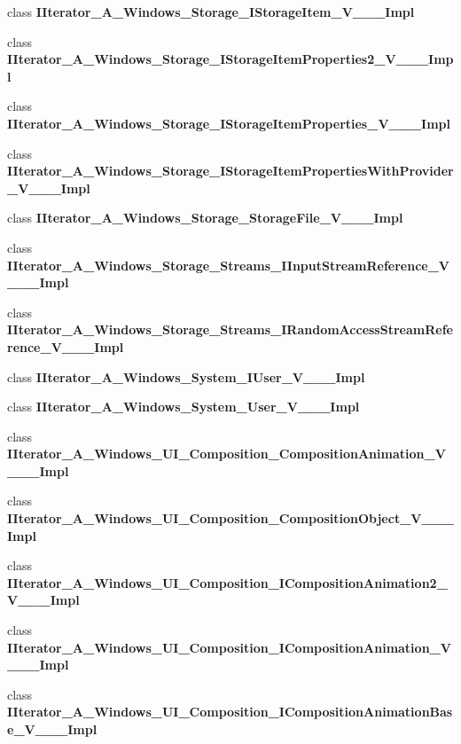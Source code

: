 \begin{DoxyCompactItemize}
\item 
class {\bfseries I\+Iterator\+\_\+\+A\+\_\+\+Windows\+\_\+\+Storage\+\_\+\+I\+Storage\+Item\+\_\+\+V\+\_\+\+\_\+\+\_\+\+Impl}
\item 
class {\bfseries I\+Iterator\+\_\+\+A\+\_\+\+Windows\+\_\+\+Storage\+\_\+\+I\+Storage\+Item\+Properties2\+\_\+\+V\+\_\+\+\_\+\+\_\+\+Impl}
\item 
class {\bfseries I\+Iterator\+\_\+\+A\+\_\+\+Windows\+\_\+\+Storage\+\_\+\+I\+Storage\+Item\+Properties\+\_\+\+V\+\_\+\+\_\+\+\_\+\+Impl}
\item 
class {\bfseries I\+Iterator\+\_\+\+A\+\_\+\+Windows\+\_\+\+Storage\+\_\+\+I\+Storage\+Item\+Properties\+With\+Provider\+\_\+\+V\+\_\+\+\_\+\+\_\+\+Impl}
\item 
class {\bfseries I\+Iterator\+\_\+\+A\+\_\+\+Windows\+\_\+\+Storage\+\_\+\+Storage\+File\+\_\+\+V\+\_\+\+\_\+\+\_\+\+Impl}
\item 
class {\bfseries I\+Iterator\+\_\+\+A\+\_\+\+Windows\+\_\+\+Storage\+\_\+\+Streams\+\_\+\+I\+Input\+Stream\+Reference\+\_\+\+V\+\_\+\+\_\+\+\_\+\+Impl}
\item 
class {\bfseries I\+Iterator\+\_\+\+A\+\_\+\+Windows\+\_\+\+Storage\+\_\+\+Streams\+\_\+\+I\+Random\+Access\+Stream\+Reference\+\_\+\+V\+\_\+\+\_\+\+\_\+\+Impl}
\item 
class {\bfseries I\+Iterator\+\_\+\+A\+\_\+\+Windows\+\_\+\+System\+\_\+\+I\+User\+\_\+\+V\+\_\+\+\_\+\+\_\+\+Impl}
\item 
class {\bfseries I\+Iterator\+\_\+\+A\+\_\+\+Windows\+\_\+\+System\+\_\+\+User\+\_\+\+V\+\_\+\+\_\+\+\_\+\+Impl}
\item 
class {\bfseries I\+Iterator\+\_\+\+A\+\_\+\+Windows\+\_\+\+U\+I\+\_\+\+Composition\+\_\+\+Composition\+Animation\+\_\+\+V\+\_\+\+\_\+\+\_\+\+Impl}
\item 
class {\bfseries I\+Iterator\+\_\+\+A\+\_\+\+Windows\+\_\+\+U\+I\+\_\+\+Composition\+\_\+\+Composition\+Object\+\_\+\+V\+\_\+\+\_\+\+\_\+\+Impl}
\item 
class {\bfseries I\+Iterator\+\_\+\+A\+\_\+\+Windows\+\_\+\+U\+I\+\_\+\+Composition\+\_\+\+I\+Composition\+Animation2\+\_\+\+V\+\_\+\+\_\+\+\_\+\+Impl}
\item 
class {\bfseries I\+Iterator\+\_\+\+A\+\_\+\+Windows\+\_\+\+U\+I\+\_\+\+Composition\+\_\+\+I\+Composition\+Animation\+\_\+\+V\+\_\+\+\_\+\+\_\+\+Impl}
\item 
class {\bfseries I\+Iterator\+\_\+\+A\+\_\+\+Windows\+\_\+\+U\+I\+\_\+\+Composition\+\_\+\+I\+Composition\+Animation\+Base\+\_\+\+V\+\_\+\+\_\+\+\_\+\+Impl}

\end{DoxyCompactItemize}

